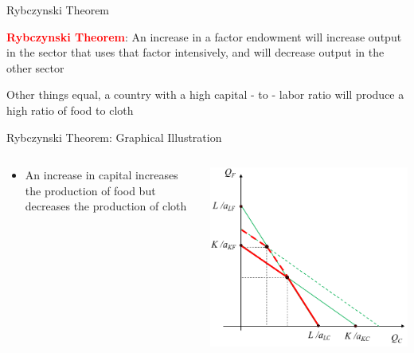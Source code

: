 \documentclass[10pt,hyperref={CJKbookmarks=true},xcolor=dvipsnames,aspectratio=169]{beamer}
\begin{document}
\begin{frame}{Rybczynski Theorem }

\begin{theorem}
\textbf{\textcolor{red}{Rybczynski Theorem}}: An increase in a factor
endowment will increase output in the sector that uses that factor
intensively, and will decrease output in the other sector\end{theorem}

\begin{corollary}
Other things equal, a country with a high capital - to - labor ratio
will produce a high ratio of food to cloth
\end{corollary}

\end{frame}

\begin{frame}{Rybczynski Theorem: Graphical Illustration }


\begin{columns}[onlytextwidth]
\begin{column}{0.5\textwidth}
\begin{itemize}
\item An increase in capital increases the production of food but decreases
the production of cloth 
\end{itemize}

\end{column}
\begin{column}{0.5\textwidth}
\includegraphics[width=\columnwidth]{fig/ho/lec5-9}
\end{column}
\end{columns}

\end{frame}
\end{document}
